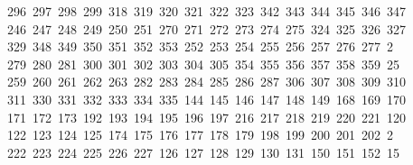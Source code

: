 \begin{tabbing}
\>\ 296\ 297\ 298\ 299\ 318\ 319\ 320\ 321\ 322\ 323\ 342\ 343\ 344\ 345\ 346\ 347\\[0pt]
\>\ 246\ 247\ 248\ 249\ 250\ 251\ 270\ 271\ 272\ 273\ 274\ 275\ 324\ 325\ 326\ 327\ \\[0pt]
\ 329\ 348\ 349\ 350\ 351\ 352\ 353\ 252\ 253\ 254\ 255\ 256\ 257\ 276\ 277\ 2\\[0pt]
\ 279\ 280\ 281\ 300\ 301\ 302\ 303\ 304\ 305\ 354\ 355\ 356\ 357\ 358\ 359\ 25\\[0pt]
\ 259\ 260\ 261\ 262\ 263\ 282\ 283\ 284\ 285\ 286\ 287\ 306\ 307\ 308\ 309\ 310\\[0pt]
\>\ 311\ 330\ 331\ 332\ 333\ 334\ 335\ 144\ 145\ 146\ 147\ 148\ 149\ 168\ 169\ 170\\[0pt]
\>\ 171\ 172\ 173\ 192\ 193\ 194\ 195\ 196\ 197\ 216\ 217\ 218\ 219\ 220\ 221\ 120\ \\[0pt]
\ 122\ 123\ 124\ 125\ 174\ 175\ 176\ 177\ 178\ 179\ 198\ 199\ 200\ 201\ 202\ 2\\[0pt]
\ 222\ 223\ 224\ 225\ 226\ 227\ 126\ 127\ 128\ 129\ 130\ 131\ 150\ 151\ 152\ 15\\[0pt]

\end{tabbing}
